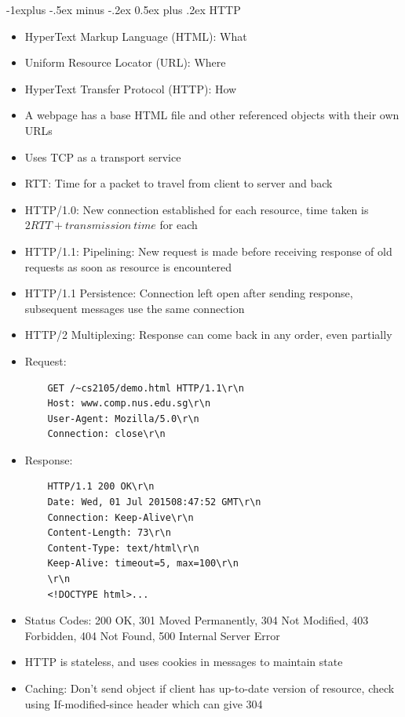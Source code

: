 \documentclass[10pt, landscape]{article}
\makeatletter
\renewcommand{\section}{\@startsection{section}{1}{0mm}%
                                {-1ex plus -.5ex minus -.2ex}%
                                {0.5ex plus .2ex}%
                                {\normalfont\large\bfseries}}
\renewcommand{\section}{\@startsection{section}{2}{0mm}%
                                {-1explus -.5ex minus -.2ex}%
                                {0.5ex plus .2ex}%
                                {\normalfont\normalsize\bfseries}}
\makeatother
\begin{document}
\begin{multicols*}{3}
\section{HTTP}
\begin{itemize}
    \item HyperText Markup Language (HTML): What
    \item Uniform Resource Locator (URL): Where
    \item HyperText Transfer Protocol (HTTP): How
    \item A webpage has a base HTML file and other referenced objects with their own URLs
    \item Uses TCP as a transport service
    \item RTT: Time for a packet to travel from client to server and back
    \item HTTP/1.0: New connection established for each resource, time taken is $2RTT+transmission\ time$ for each
    \item HTTP/1.1: Pipelining: New request is made before receiving response of old requests as soon as resource is encountered
    \item HTTP/1.1 Persistence: Connection left open after sending response, subsequent messages use the same connection
    \item HTTP/2 Multiplexing: Response can come back in any order, even partially
    \item Request:
\begin{verbatim}
    GET /~cs2105/demo.html HTTP/1.1\r\n
    Host: www.comp.nus.edu.sg\r\n
    User-Agent: Mozilla/5.0\r\n
    Connection: close\r\n
\end{verbatim}
    \item Response:
\begin{verbatim}
    HTTP/1.1 200 OK\r\n
    Date: Wed, 01 Jul 201508:47:52 GMT\r\n
    Connection: Keep-Alive\r\n
    Content-Length: 73\r\n
    Content-Type: text/html\r\n
    Keep-Alive: timeout=5, max=100\r\n
    \r\n
    <!DOCTYPE html>...
\end{verbatim}
    \item Status Codes: 200 OK, 301 Moved Permanently, 304 Not Modified, 403 Forbidden, 404 Not Found, 500 Internal Server Error
    \item HTTP is stateless, and uses cookies in messages to maintain state
    \item Caching: Don't send object if client has up-to-date version of resource, check using If-modified-since header which can give 304
\end{itemize}


\end{multicols*}
\end{document}

